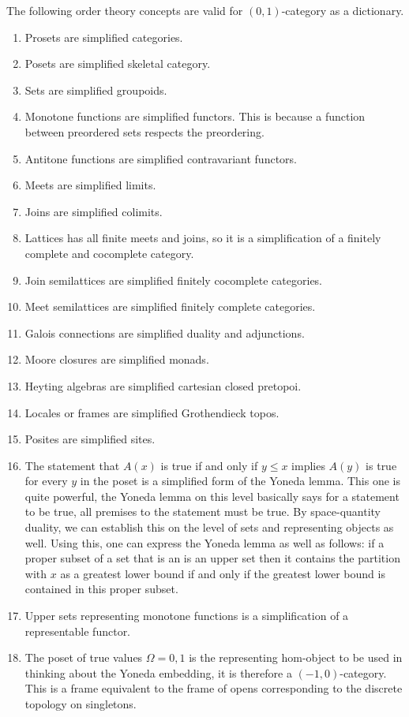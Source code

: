 \documentclass[10pt]{article}
\theoremstyle{plain}%
\theoremstyle{definition}
\theoremstyle{remark}
\begin{document}
The following order theory concepts are valid for $(0,1)$-category as a dictionary.

\begin{enumerate}
	\item Prosets are simplified categories.
	\item Posets are simplified skeletal category.
	\item Sets are simplified groupoids.
	\item Monotone functions are simplified functors. This is because a function between preordered sets respects the preordering.
	\item Antitone functions are simplified contravariant functors.
	\item Meets are simplified limits.
	\item Joins are simplified colimits.
	\item Lattices has all finite meets and joins, so it is a simplification of a finitely complete and cocomplete category.
	\item Join semilattices are simplified finitely cocomplete categories.
	\item Meet semilattices are simplified finitely complete categories.
	\item Galois connections are simplified duality and adjunctions.
	\item Moore closures are simplified monads.
	\item Heyting algebras are simplified cartesian closed pretopoi.
	\item Locales or frames are simplified Grothendieck topos.
	\item Posites are simplified sites.
	\item The statement that $A(x)$ is true if and only if $y \leq x$ implies $A(y)$ is true for every $y$ in the poset is a simplified form of the Yoneda lemma. This one is quite powerful, the Yoneda lemma on this level basically says for a statement to be true, all premises to the statement must be true. By space-quantity duality, we can establish this on the level of sets and representing objects as well. Using this, one can express the Yoneda lemma as well as follows: if a proper subset of a set that is an is an upper set then it contains the partition with $x$ as a greatest lower bound if and only if the greatest lower bound is contained in this proper subset. 
	\item Upper sets representing monotone functions is a simplification of a representable functor. 
	\item The poset of true values $\Omega = {0,1}$ is the representing hom-object to be used in thinking about the Yoneda embedding, it is therefore a $(-1,0)$-category. This is a frame equivalent to the frame of opens corresponding to the discrete topology on singletons.

\end{enumerate}
\end{document}

